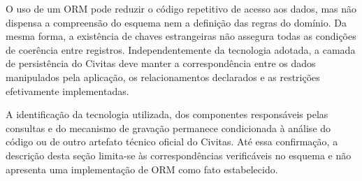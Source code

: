 O uso de um ORM pode reduzir o código repetitivo de acesso aos dados, mas não dispensa a compreensão do esquema nem a definição das regras do domínio. Da mesma forma, a existência de chaves estrangeiras não assegura todas as condições de coerência entre registros. Independentemente da tecnologia adotada, a camada de persistência do Civitas deve manter a correspondência entre os dados manipulados pela aplicação, os relacionamentos declarados e as restrições efetivamente implementadas.

A identificação da tecnologia utilizada, dos componentes responsáveis pelas consultas e do mecanismo de gravação permanece condicionada à análise do código ou de outro artefato técnico oficial do Civitas. Até essa confirmação, a descrição desta seção limita-se às correspondências verificáveis no esquema e não apresenta uma implementação de ORM como fato estabelecido.


\fi


















